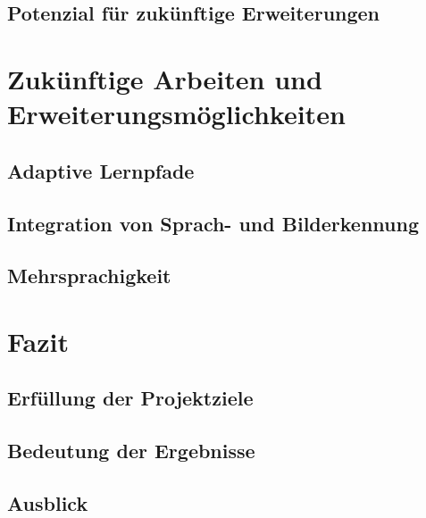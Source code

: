 \documentclass[a4paper,12pt]{article}
\begin{document}
\subsection{Potenzial für zukünftige Erweiterungen}

\newpage

\section{Zukünftige Arbeiten und Erweiterungsmöglichkeiten}
\subsection{Adaptive Lernpfade}
\subsection{Integration von Sprach- und Bilderkennung}
\subsection{Mehrsprachigkeit}

\newpage

\section{Fazit}
\subsection{Erfüllung der Projektziele}
\subsection{Bedeutung der Ergebnisse}
\subsection{Ausblick}


\newpage
\nocite{*}
\printbibliography
\end{document}
